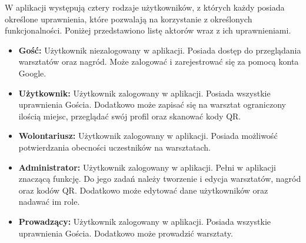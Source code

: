 W aplikacji występują cztery rodzaje użytkowników, z których każdy posiada określone uprawnienia, które pozwalają na korzystanie z określonych funkcjonalności. Poniżej przedstawiono listę aktorów wraz z ich uprawnieniami.
\begin{itemize}
    \item \textbf{Gość:} Użytkownik niezalogowany w aplikacji. Posiada dostęp do przeglądania warsztatów oraz nagród. Może zalogować i zarejestrować się za pomocą konta Google.
    \item \textbf{Użytkownik:} Użytkownik zalogowany w aplikacji. Posiada wszystkie uprawnienia Gościa. Dodatkowo może zapisać się na warsztat ograniczony ilością miejsc, przeglądać swój profil oraz skanować kody QR.
    \item  \textbf{Wolontariusz:} Użytkownik zalogowany w aplikacji. Posiada możliwość potwierdzania obecności uczestników na warsztatach.
    \item \textbf{Administrator:} Użytkownik zalogowany w aplikacji. Pełni w aplikacji znaczącą funkcję. Do jego zadań należy tworzenie i edycja warsztatów, nagród oraz kodów QR. Dodatkowo może edytować dane użytkowników oraz nadawać im role.
    \item \textbf{Prowadzący:} Użytkownik zalogowany w aplikacji. Posiada wszystkie uprawnienia Gościa. Dodatkowo może prowadzić warsztaty.
\end{itemize}